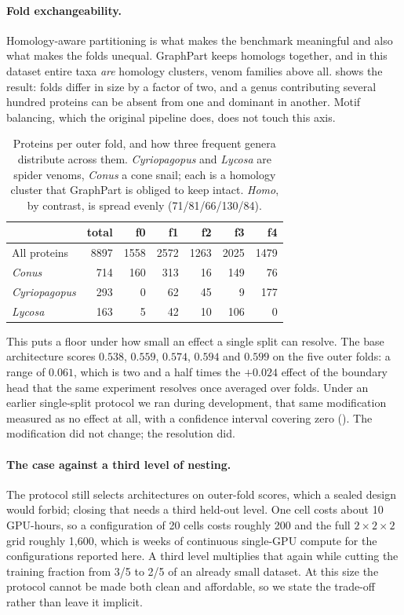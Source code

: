 \documentclass{article}
\begin{document}
\paragraph{Fold exchangeability.} Homology-aware partitioning is what makes the benchmark meaningful and also what makes the folds unequal. GraphPart keeps homologs together, and in this dataset entire taxa \emph{are} homology clusters, venom families above all.  shows the result: folds differ in size by a factor of two, and a genus contributing several hundred proteins can be absent from one and dominant in another. Motif balancing, which the original pipeline does, does not touch this axis.

\begin{table}[h]
\centering
\caption{Proteins per outer fold, and how three frequent genera distribute across them. \emph{Cyriopagopus} and \emph{Lycosa} are spider venoms, \emph{Conus} a cone snail; each is a homology cluster that GraphPart is obliged to keep intact. \textit{Homo}, by contrast, is spread evenly (71/81/66/130/84).}
\label{tab:genus}
\small
\begin{tabular}{lrrrrrr}
\toprule
 & \textbf{total} & \textbf{f0} & \textbf{f1} & \textbf{f2} & \textbf{f3} & \textbf{f4} \\
\midrule
All proteins & 8897 & 1558 & 2572 & 1263 & 2025 & 1479 \\
\midrule
\textit{Conus} & 714 & 160 & 313 & 16 & 149 & 76 \\
\textit{Cyriopagopus} & 293 & 0 & 62 & 45 & 9 & 177 \\
\textit{Lycosa} & 163 & 5 & 42 & 10 & 106 & 0 \\
\bottomrule
\end{tabular}
\end{table}

This puts a floor under how small an effect a single split can resolve. The base architecture scores $0.538$, $0.559$, $0.574$, $0.594$ and $0.599$ on the five outer folds: a range of $0.061$, which is two and a half times the $+0.024$ effect of the boundary head that the same experiment resolves once averaged over folds. Under an earlier single-split protocol we ran during development, that same modification measured as no effect at all, with a confidence interval covering zero (). The modification did not change; the resolution did.

\paragraph{The case against a third level of nesting.} The protocol still selects architectures on outer-fold scores, which a sealed design would forbid; closing that needs a third held-out level. One cell costs about 10 GPU-hours, so a configuration of 20 cells costs roughly 200 and the full $2\times2\times2$ grid roughly 1{,}600, which is weeks of continuous single-GPU compute for the configurations reported here. A third level multiplies that again while cutting the training fraction from 3/5 to 2/5 of an already small dataset. At this size the protocol cannot be made both clean and affordable, so we state the trade-off rather than leave it implicit.
\end{document}
